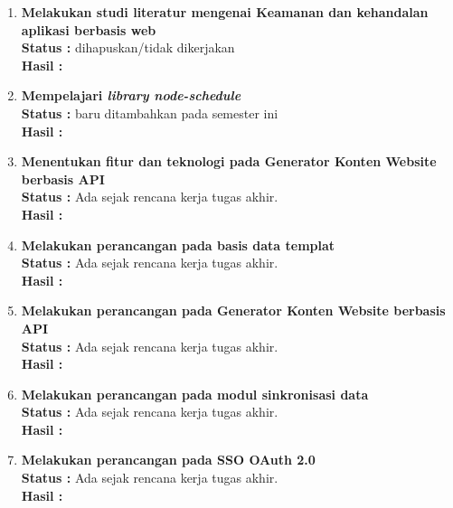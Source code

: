 \begin{enumerate}
    \item \textbf{Melakukan studi literatur mengenai Keamanan dan kehandalan aplikasi berbasis web}\\
    {\bf Status :} dihapuskan/tidak dikerjakan \\
    {\bf Hasil :}\\
    

    \item \textbf{Mempelajari \textit{library node-schedule}}\\
    {\bf Status :} baru ditambahkan pada semester ini\\
    {\bf Hasil :}\\
    

    \item \textbf{Menentukan fitur dan teknologi pada Generator Konten Website berbasis API}\\
    {\bf Status :} Ada sejak rencana kerja tugas akhir.\\
    {\bf Hasil :}\\
     

    \item \textbf{Melakukan perancangan pada basis data templat}\\
    {\bf Status :} Ada sejak rencana kerja tugas akhir.\\
    {\bf Hasil :}\\
    

    \item \textbf{Melakukan perancangan pada Generator Konten Website
    berbasis API}\\
    {\bf Status :} Ada sejak rencana kerja tugas akhir.\\
    {\bf Hasil :}\\
    \label{sec:perancangan-generator-konten-website}
     

    \item \textbf{Melakukan perancangan pada modul sinkronisasi data}\\
    {\bf Status :} Ada sejak rencana kerja tugas akhir.\\
    {\bf Hasil :}\\
    

    \item \textbf{Melakukan perancangan pada SSO OAuth 2.0}\\
    {\bf Status :} Ada sejak rencana kerja tugas akhir.\\
    {\bf Hasil :}\\
    


\end{enumerate}
